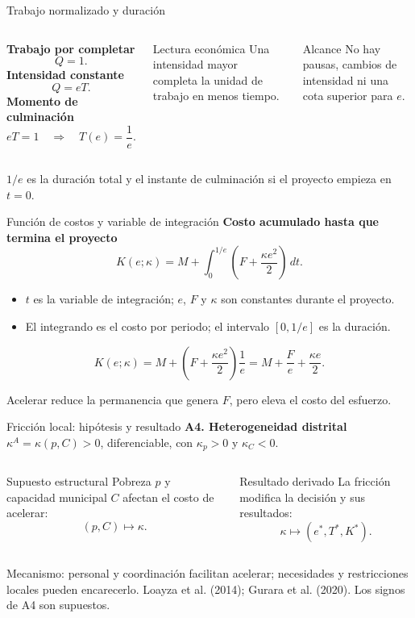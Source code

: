 \documentclass[aspectratio=169,11pt]{beamer}
\newcommand{\nota}[1]{\par\vfill{\footnotesize\color{blue}#1}}
\begin{document}
\begin{frame}{Trabajo normalizado y duración}
\begin{columns}[T]
\textbf{Trabajo por completar}\[Q=1.\]
\textbf{Intensidad constante}\[Q=eT.\]
\textbf{Momento de culminación}
\[eT=1\quad\Longrightarrow\quad\boxed{T(e)=\frac1e}.\]
\begin{block}{Lectura económica}
Una intensidad mayor completa la unidad de trabajo en menos tiempo.
\end{block}
\begin{block}{Alcance}
No hay pausas, cambios de intensidad ni una cota superior para $e$.
\end{block}
\end{columns}
\nota{$1/e$ es la duración total y el instante de culminación si el proyecto empieza en $t=0$.}
\end{frame}

\begin{frame}{Función de costos y variable de integración}
\textbf{Costo acumulado hasta que termina el proyecto}
\[
K(e;\kappa)=M+\int_0^{1/e}\left(F+\frac{\kappa e^2}{2}\right)\,dt.
\]
\begin{itemize}
\item $t$ es la variable de integración; $e$, $F$ y $\kappa$ son constantes durante el proyecto.
\item El integrando es el costo por periodo; el intervalo $[0,1/e]$ es la duración.
\end{itemize}
\[
K(e;\kappa)=M+\left(F+\frac{\kappa e^2}{2}\right)\frac1e
=\boxed{M+\frac Fe+\frac{\kappa e}{2}}.
\]
\nota{Acelerar reduce la permanencia que genera $F$, pero eleva el costo del esfuerzo.}
\end{frame}

\begin{frame}{Fricción local: hipótesis y resultado}
\textbf{A4. Heterogeneidad distrital}\quad
$\kappa^A=\kappa(p,C)>0$, diferenciable, con $\kappa_p>0$ y $\kappa_C<0$.
\medskip
\begin{columns}[T]
\begin{block}{Supuesto estructural}
Pobreza $p$ y capacidad municipal $C$ afectan el costo de acelerar:
\[(p,C)\longmapsto\kappa.\]
\end{block}
\begin{block}{Resultado derivado}
La fricción modifica la decisión y sus resultados:
\[\kappa\longmapsto(e^*,T^*,K^*).\]
\end{block}
\end{columns}
\nota{Mecanismo: personal y coordinación facilitan acelerar; necesidades y restricciones locales pueden encarecerlo. Loayza et al. (2014); Gurara et al. (2020). Los signos de A4 son supuestos.}
\end{frame}
\end{document}
